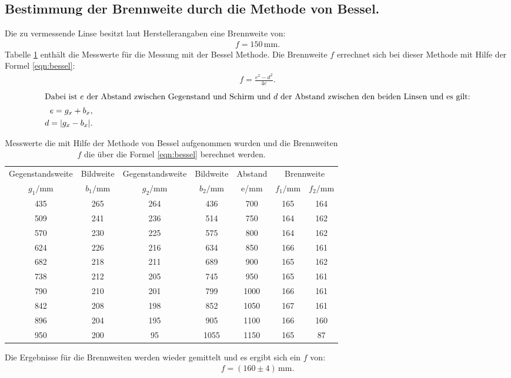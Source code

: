 \subsection{Bestimmung der Brennweite durch die Methode von Bessel.}
Die zu vermessende Linse besitzt laut Herstellerangaben eine Brennweite von:
\begin{align*}
  f=150\,\si{\milli\meter}.
\end{align*}
Tabelle \ref{tab:bessel} enthält die Messwerte für die Messung mit der Bessel Methode.
Die Brennweite $f$ errechnet sich bei dieser Methode mit Hilfe der Formel \ref{eqn:bessel}:
\begin{align}
    f=\frac{e^2-d^2}{4e}\label{eqn:bessel}.
\end{align}
\begin{align*}
    \intertext{Dabei ist $e$ der Abstand zwischen Gegenstand und Schirm und
    $d$ der Abstand zwischen den beiden Linsen und es gilt:}
    e=g_x+b_x,\\
    d=|g_x-b_x|.
\end{align*}
\begin{table}
    \centering
    \caption{Messwerte die mit Hilfe der Methode von Bessel aufgenommen wurden
    und die Brennweiten $f$ die über die Formel \eqref{eqn:bessel} berechnet werden.}
    \label{tab:bessel}
    \begin{tabular}{c c c c c c c}
    \toprule
    Gegenstandsweite   & Bildweite &  Gegenstandsweite   & Bildweite & Abstand  & \multicolumn{2}{c}{Brennweite}\\
    $g_1/\si{\milli\meter}$ & $b_1/\si{\milli\meter}$ &$g_2/\si{\milli\meter}$ & $b_2/\si{\milli\meter}$ & e/\si{\milli\meter} & $f_1/\si{\milli\meter}$ & $f_2/\si{\milli\meter}$\\
    \midrule
  435  &   265 &   264 &   436  & 700  & 165 & 164 \\
  509  &   241 &   236 &   514  & 750  & 164 & 162 \\
  570  &   230 &   225 &   575  & 800  & 164 & 162 \\
  624  &   226 &   216 &   634  & 850  & 166 & 161 \\
  682  &   218 &   211 &   689  & 900  & 165 & 162 \\
  738  &   212 &   205 &   745  & 950  & 165 & 161 \\
  790  &   210 &   201 &   799  & 1000 & 166 & 161 \\
  842  &   208 &   198 &   852  & 1050 & 167 & 161 \\
  896  &   204 &   195 &   905  & 1100 & 166 & 160 \\
  950  &   200 &    95 &   1055 & 1150 & 165 & 87  \\
  \bottomrule
\end{tabular}
\end{table}
\FloatBarrier
Die Ergebnisse für die Brennweiten
werden wieder gemittelt und es ergibt sich ein $f$ von:
\begin{align*}
  f=(160\pm4)\,\si{\milli\meter}.
\end{align*}

